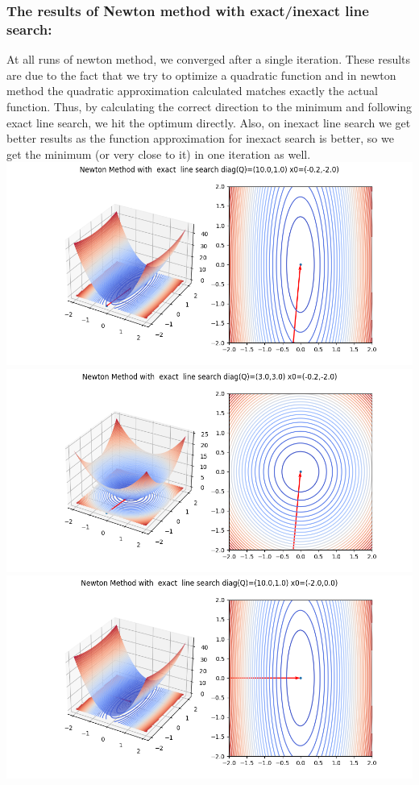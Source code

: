 \documentclass{article}
\begin{document}
\subsubsection{The results of Newton method with exact/inexact line search:}
At all runs of newton method, we converged after a single iteration. These results are due to the fact that we try to optimize a quadratic function and in newton method the quadratic approximation calculated matches exactly the actual function. Thus, by calculating the correct direction to the minimum and following exact line search, we hit the optimum directly. Also, on inexact line search we get better results as the function approximation for inexact search is better, so we get the minimum (or very close to it) in one iteration as well.
\includegraphics[scale=0.5]{nm_exact_1.png}\\
\includegraphics[scale=0.5]{nm_exact_2_circle.png}
\includegraphics[scale=0.5]{nm_exact_3_elipse_easy_start_point.png}
\end{document}
